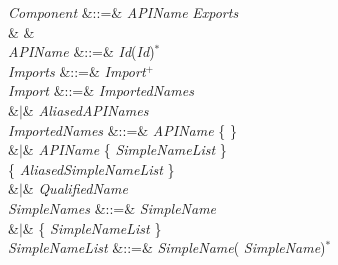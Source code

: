 
\begin{Grammar}
\emph{Component} &::=&
 \emph{APIName}  \emph{Exports}
 \\
& &\\

\emph{APIName} &::=& \emph{Id}(\emph{Id})$^*$\\

\emph{Imports} &::=& \emph{Import}$^+$\\
\emph{Import}
&::=&  \emph{ImportedNames} \\
&$|$&   \emph{AliasedAPINames} \\

\emph{ImportedNames}
&::=& \emph{APIName}  \{  \}
\\
&$|$& \emph{APIName} 
\{ \emph{SimpleNameList}  \}\\
\{ \emph{AliasedSimpleNameList}  \}\\
&$|$& \emph{QualifiedName} \\

\emph{SimpleNames} &::=& \emph{SimpleName} \\
&$|$& \{ \emph{SimpleNameList} \}\\

\emph{SimpleNameList} &::=& \emph{SimpleName}(\EXP{,} \emph{SimpleName})$^*$ \\

\end{Grammar}


